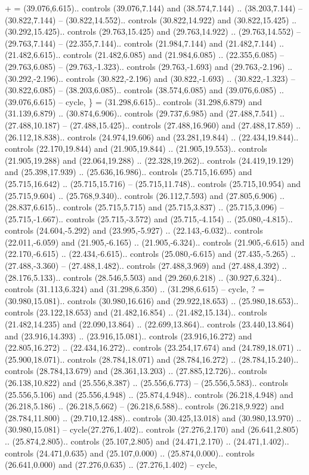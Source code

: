 {+} = {(39.076,6.615).. controls (39.076,7.144) and (38.574,7.144) .. (38.203,7.144) -- (30.822,7.144) -- (30.822,14.552).. controls (30.822,14.922) and (30.822,15.425) .. (30.292,15.425).. controls (29.763,15.425) and (29.763,14.922) .. (29.763,14.552) -- (29.763,7.144) -- (22.355,7.144).. controls (21.984,7.144) and (21.482,7.144) .. (21.482,6.615).. controls (21.482,6.085) and (21.984,6.085) .. (22.355,6.085) -- (29.763,6.085) -- (29.763,-1.323).. controls (29.763,-1.693) and (29.763,-2.196) .. (30.292,-2.196).. controls (30.822,-2.196) and (30.822,-1.693) .. (30.822,-1.323) -- (30.822,6.085) -- (38.203,6.085).. controls (38.574,6.085) and (39.076,6.085) .. (39.076,6.615) -- cycle},
{\}} = {(31.298,6.615).. controls (31.298,6.879) and (31.139,6.879) .. (30.874,6.906).. controls (29.737,6.985) and (27.488,7.541) .. (27.488,10.187) -- (27.488,15.425).. controls (27.488,16.960) and (27.488,17.859) .. (26.112,18.838).. controls (24.974,19.606) and (23.281,19.844) .. (22.434,19.844).. controls (22.170,19.844) and (21.905,19.844) .. (21.905,19.553).. controls (21.905,19.288) and (22.064,19.288) .. (22.328,19.262).. controls (24.419,19.129) and (25.398,17.939) .. (25.636,16.986).. controls (25.715,16.695) and (25.715,16.642) .. (25.715,15.716) -- (25.715,11.748).. controls (25.715,10.954) and (25.715,9.604) .. (25.768,9.340).. controls (26.112,7.593) and (27.805,6.906) .. (28.837,6.615).. controls (25.715,5.715) and (25.715,3.837) .. (25.715,3.096) -- (25.715,-1.667).. controls (25.715,-3.572) and (25.715,-4.154) .. (25.080,-4.815).. controls (24.604,-5.292) and (23.995,-5.927) .. (22.143,-6.032).. controls (22.011,-6.059) and (21.905,-6.165) .. (21.905,-6.324).. controls (21.905,-6.615) and (22.170,-6.615) .. (22.434,-6.615).. controls (25.080,-6.615) and (27.435,-5.265) .. (27.488,-3.360) -- (27.488,1.482).. controls (27.488,3.969) and (27.488,4.392) .. (28.176,5.133).. controls (28.546,5.503) and (29.260,6.218) .. (30.927,6.324).. controls (31.113,6.324) and (31.298,6.350) .. (31.298,6.615) -- cycle},
{?} = {(30.980,15.081).. controls (30.980,16.616) and (29.922,18.653) .. (25.980,18.653).. controls (23.122,18.653) and (21.482,16.854) .. (21.482,15.134).. controls (21.482,14.235) and (22.090,13.864) .. (22.699,13.864).. controls (23.440,13.864) and (23.916,14.393) .. (23.916,15.081).. controls (23.916,16.272) and (22.805,16.272) .. (22.434,16.272).. controls (23.254,17.674) and (24.789,18.071) .. (25.900,18.071).. controls (28.784,18.071) and (28.784,16.272) .. (28.784,15.240).. controls (28.784,13.679) and (28.361,13.203) .. (27.885,12.726).. controls (26.138,10.822) and (25.556,8.387) .. (25.556,6.773) -- (25.556,5.583).. controls (25.556,5.106) and (25.556,4.948) .. (25.874,4.948).. controls (26.218,4.948) and (26.218,5.186) .. (26.218,5.662) -- (26.218,6.588).. controls (26.218,9.922) and (28.784,11.800) .. (29.710,12.488).. controls (30.425,13.018) and (30.980,13.970) .. (30.980,15.081) -- cycle(27.276,1.402).. controls (27.276,2.170) and (26.641,2.805) .. (25.874,2.805).. controls (25.107,2.805) and (24.471,2.170) .. (24.471,1.402).. controls (24.471,0.635) and (25.107,0.000) .. (25.874,0.000).. controls (26.641,0.000) and (27.276,0.635) .. (27.276,1.402) -- cycle},
